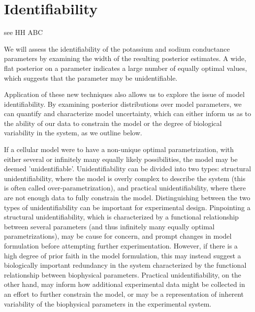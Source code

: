 \section{Identifiability}

see HH ABC 

We will assess the identifiability of the potassium and sodium conductance parameters by examining the width of the resulting posterior estimates. A wide, flat posterior on a parameter indicates a large number of equally optimal values, which suggests that the parameter may be unidentifiable.

Application of these new techniques also allows us to explore the issue of model identifiability. By examining posterior distributions over model parameters, we can quantify and characterize model uncertainty, which can either inform us as to the ability of our data to constrain the model or the degree of biological variability in the system, as we outline below.

If a cellular model were to have a non-unique optimal parametrization, with either several or infinitely many equally likely possibilities, the model may be deemed 'unidentifiable'. Unidentifiability can be divided into two types: structural unidentifiability, where the model is overly complex to describe the system (this is often called over-parametrization), and practical unidentifiability, where there are not enough data to fully constrain the model. Distinguishing between the two types of unidentifiability can be important for experimental design. Pinpointing a structural  unidentifiability, which is characterized by a functional relationship between several parameters (and thus infinitely many equally optimal parametrizations), may be cause for concern, and prompt changes in model formulation before attempting further experimentation. However, if there is a high degree of prior faith in the model formulation, this may instead suggest a biologically important redundancy in the system characterized by the functional relationship between biophysical parameters. Practical unidentifiability, on the other hand, may inform how additional experimental data might be collected in an effort to further constrain the model, or may be a representation of inherent variability of the biophysical parameters in the experimental system. 

